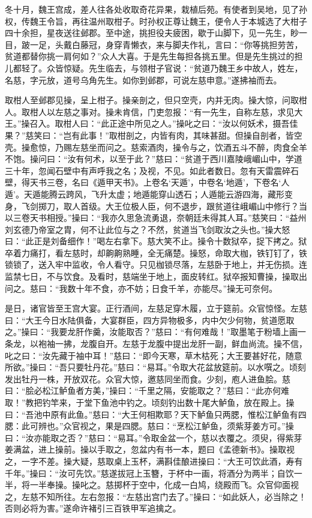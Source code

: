 冬十月，魏王宫成，差人往各处收取奇花异果，栽植后苑。有使者到吴地，见了孙权，传魏王令旨，再往温州取柑子。时孙权正尊让魏王，便令人于本城选了大柑子四十余担，星夜送往邺郡。至中途，挑担役夫疲困，歇于山脚下，见一先生，眇一目，跛一足，头戴白藤冠，身穿青懒衣，来与脚夫作礼，言曰：“你等挑担劳苦，贫道都替你挑一肩何如？”众人大喜。于是先生每担各挑五里。但是先生挑过的担儿都轻了。众皆惊疑。先生临去，与领柑子官说：“贫道乃魏王乡中故人，姓左，名慈，字元放，道号乌角先生。如你到邺郡，可说左慈申意。”遂拂袖而去。

取柑人至邺郡见操，呈上柑子。操亲剖之，但只空壳，内并无肉。操大惊，问取柑人。取柑人以左慈之事对。操未肯信，门吏忽报：“有一先生，自称左慈，求见大王。”操召入。取柑人曰：“此正途中所见之人。”操叱之曰：“汝以何妖术，摄吾佳果？”慈笑曰：“岂有此事！”取柑剖之，内皆有肉，其味甚甜。但操自剖者，皆空壳。操愈惊，乃赐左慈坐而问之。慈索酒肉，操令与之，饮酒五斗不醉，肉食全羊不饱。操问曰：“汝有何术，以至于此？”慈曰：“贫道于西川嘉陵峨嵋山中，学道三十年，忽闻石壁中有声呼我之名；及视，不见。如此者数日。忽有天雷震碎石壁，得天书三卷，名曰《遁甲天书》。上卷名‘天遁’，中卷名‘地遁’，下卷名‘人遁’。天遁能腾云跨风，飞升太虚；地遁能穿山透石；人遁能云游四海，藏形变身，飞剑掷刀，取人首级。大王位极人臣，何不退步，跟贫道往峨嵋山中修行？当以三卷天书相授。”操曰：“我亦久思急流勇退，奈朝廷未得其人耳。”慈笑曰：“益州刘玄德乃帝室之胄，何不让此位与之？不然，贫道当飞剑取汝之头也。”操大怒曰：“此正是刘备细作！”喝左右拿下。慈大笑不止。操令十数狱卒，捉下拷之。狱卒着力痛打，看左慈时，却齁齁熟睡，全无痛楚。操怒，命取大枷，铁钉钉了，铁锁锁了，送入牢中监收，令人看守。只见枷锁尽落，左慈卧于地上，并无伤损。连监禁七日，不与饮食。及看时，慈端坐于地上，面皮转红。狱卒报知曹操，操取出问之。慈曰：“我数十年不食，亦不妨；日食千羊，亦能尽。”操无可奈何。

是日，诸官皆至王宫大宴。正行酒间，左慈足穿木履，立于筵前。众官惊怪。左慈曰：“大王今日水陆俱备，大宴群臣，四方异物极多，内中欠少何物，贫道愿取之。”操曰：“我要龙肝作羹，汝能取否？”慈曰：“有何难哉！”取墨笔于粉墙上画一条龙，以袍袖一拂，龙腹自开。左慈于龙腹中提出龙肝一副，鲜血尚流。操不信，叱之曰：“汝先藏于袖中耳！”慈曰：“即今天寒，草木枯死；大王要甚好花，随意所欲。”操曰：“吾只要牡丹花。”慈曰：“易耳。”令取大花盆放筵前。以水噀之。顷刻发出牡丹一株，开放双花。众官大惊，邀慈同坐而食。少刻，庖人进鱼脍。慈曰：“脍必松江鲈鱼者方美，”操曰：“千里之隔，安能取之？”慈曰：“此亦何难取！”教把钓竿来，于堂下鱼池中钓之。顷刻钓出数十尾大鲈鱼，放在殿上。操曰：“吾池中原有此鱼。”慈曰：“大王何相欺耶？天下鲈鱼只两腮，惟松江鲈鱼有四腮：此可辨也。”众官视之，果是四腮。慈曰：“烹松江鲈鱼，须紫芽姜方可。”操曰：“汝亦能取之否？”慈曰：“易耳。”令取金盆一个，慈以衣覆之。须臾，得紫芽姜满盆，进上操前。操以手取之，忽盆内有书一本，题曰《孟德新书》。操取视之，一字不差。操大疑，慈取桌上玉杯，满斟佳酿进操曰：“大王可饮此酒，寿有千年。”操曰：“汝可先饮。”慈遂拔冠上玉簪，于杯中一画，将酒分为两半；自饮一半，将一半奉操。操叱之。慈掷杯于空中，化成一白鸠，绕殿而飞。众官仰面视之，左慈不知所往。左右忽报：“左慈出宫门去了。”操曰：“如此妖人，必当除之！否则必将为害。”遂命许褚引三百铁甲军追擒之。

